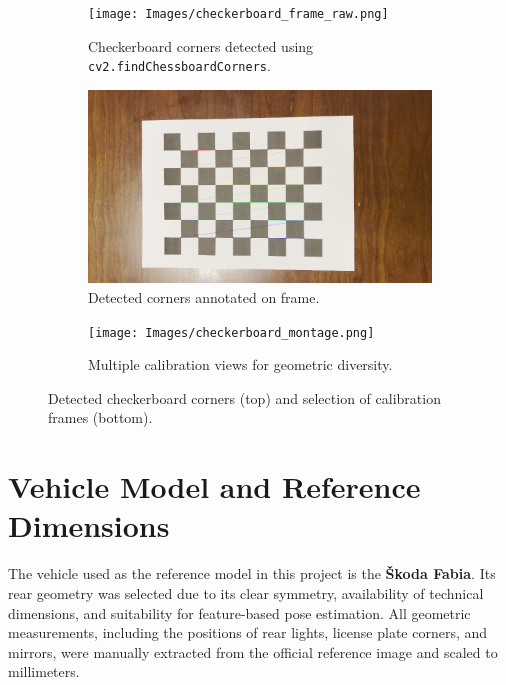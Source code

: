 \begin{figure}[htbp]
    \centering
    \begin{subfigure}[b]{0.48\textwidth}
        \centering
        \texttt{[image: Images/checkerboard\_frame\_raw.png]}
        \caption{Checkerboard corners detected using \texttt{cv2.findChessboardCorners}.}
        \label{fig:checkerboard-raw}
    \end{subfigure}
    \hfill
    \begin{subfigure}[b]{0.48\textwidth}
        \centering
        \includegraphics[width=\textwidth]{Images/checkerboard_frame_annotated.png}
        \caption{Detected corners annotated on frame.}
        \label{fig:checkerboard-annotated}
    \end{subfigure}

    \vspace{1em} %

    \begin{subfigure}[b]{0.85\textwidth}
        \centering
        \texttt{[image: Images/checkerboard\_montage.png]}
        \caption{Multiple calibration views for geometric diversity.}
        \label{fig:checkerboard-diverse}
    \end{subfigure}

    \caption{Detected checkerboard corners (top) and selection of calibration frames (bottom).}
    \label{fig:checkerboard-combined}
\end{figure}

\section{Vehicle Model and Reference Dimensions}
The vehicle used as the reference model in this project is the \textbf{Škoda Fabia}. Its rear geometry was selected due to its clear symmetry, availability of technical dimensions, and suitability for feature-based pose estimation. All geometric measurements, including the positions of rear lights, license plate corners, and mirrors, were manually extracted from the official reference image and scaled to millimeters.

